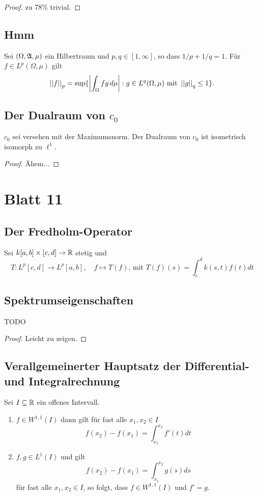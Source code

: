 \documentclass[FunkAnaSkriptSS2017.tex]{subfiles} %
\begin{document}
	\begin{proof}
	zu 78\% trivial.
	\end{proof}


\subsection{ Hmm}
	Sei $(\Omega, \mathfrak{A}, \mu )$ ein Hilbertraum und $p,q \in [1,\infty]$, so dass $1/p + 1/q = 1$. Für $f\in L^p(\Omega , \mu )$ gilt
	$$ \left\lvert \left\lvert f \right\rvert \right\rvert_p = \sup \{ \left\lvert  \int_{\Omega } fg\,d\mu  \right\rvert : g \in L^q(\Omega, \mu ) \text{ mit } \left\lvert \left\lvert g \right\rvert \right\rvert_q \leq 1 \}.$$
	
	
\subsection{ Der Dualraum von $c_0$}
	$c_0$ sei versehen mit der Maximumsnorm. Der Dualraum von $c_0$ ist isometrisch isomorph zu $\ell^1$.
	
	\begin{proof}
	Ähem...
	\end{proof}


\newpage
\section{ Blatt 11}

\subsection{ Der Fredholm-Operator}
	Sei $k [a,b] \times [c,d] \to\mathbb{R}$ stetig und
	$$ T : L^p[c,d] \to L^p[a,b], \quad f \mapsto T(f) \text{, mit } T(f)(s)= \int^d_c k(s,t) f(t) dt$$


\subsection{ Spektrumseigenschaften}
TODO
	\begin{proof}
	Leicht zu zeigen.
	\end{proof}


\subsection{ Verallgemeinerter Hauptsatz der Differential- und Integralrechnung}
	Sei $I\subseteq \mathbb{R}$ ein offenes Intervall.
	\begin{enumerate}
		\item $f \in W^{1,1}(I)$ dann gilt für fast alle $x_1, x_2 \in I$ 
		$$f(x_2) - f(x_1) = \int^{x_2}_{x_1} f'(t) dt$$
		\item $f,g \in L^1(I)$ und  gilt
		$$f(x_2) - f(x_1) = \int^{x_2}_{x_1} g(s) ds$$
		für fast alle $x_1,x_2 \in I$, so folgt, dass $f \in W^{1,1}(I)$ und $f' = g$.
	\end{enumerate}
\end{document}
